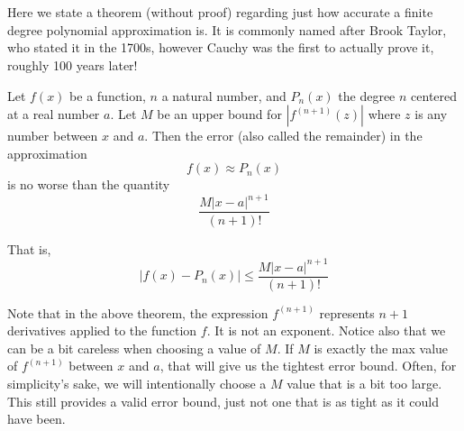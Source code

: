 \section{}

Here we state a theorem (without proof) regarding just how accurate a finite degree polynomial approximation is.  It is commonly named after Brook Taylor, who stated it in the 1700s, however Cauchy was the first to actually prove it, roughly 100 years later!

\begin{theorem}{}
Let $f(x)$ be a function, $n$ a natural number, and $P_n(x)$ the degree $n$  centered at a real number $a$. Let $M$ be an upper bound for $\left|f^{(n+1)}(z)\right|$ where $z$ is any number between $x$ and $a$.  Then the error (also called the remainder) in the approximation $$f(x)\approx P_n(x) $$ is no worse than the quantity $$\frac{M|x-a|^{n+1}}{(n+1)!} $$

That is, $$\left| f(x)- P_n(x)\right|\leq \frac{M|x-a|^{n+1}}{(n+1)!} $$
\end{theorem}

Note that in the above theorem, the expression $f^{(n+1)}$ represents $n+1$ derivatives applied to the function $f$.  It is not an exponent.  Notice also that we can be a bit careless when choosing a value of $M$.  If $M$ is exactly the max value of $f^{(n+1)}$ between $x$ and $a$, that will give us the tightest error bound.  Often, for simplicity's sake, we will intentionally choose a $M$ value that is a bit too large.  This still provides a valid error bound, just not one that is as tight as it could have been.  

